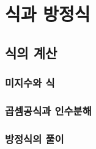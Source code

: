 \chapter{식과 방정식}

\section{식의 계산} 

\subsection{미지수와 식} 

\subsection{곱셈공식과 인수분해} 

\subsection{방정식의 풀이}



